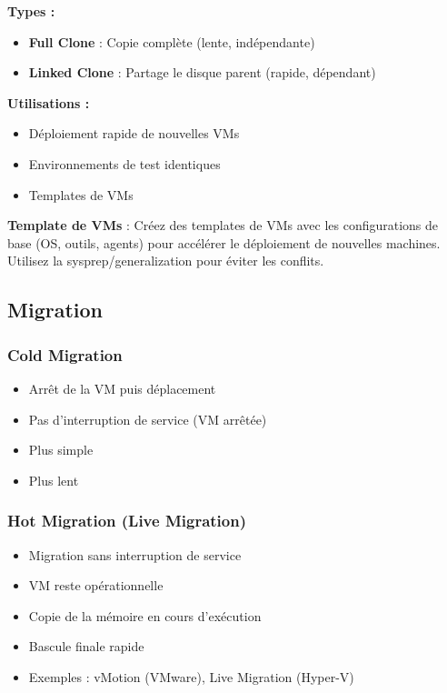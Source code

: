 \documentclass[11pt,a4paper]{article}
\begin{document}
\textbf{Types :}
\begin{itemize}
    \item \textbf{Full Clone} : Copie complète (lente, indépendante)
    \item \textbf{Linked Clone} : Partage le disque parent (rapide, dépendant)
\end{itemize}

\textbf{Utilisations :}
\begin{itemize}
    \item Déploiement rapide de nouvelles VMs
    \item Environnements de test identiques
    \item Templates de VMs
\end{itemize}

\begin{tipbox}
\textbf{Template de VMs} : Créez des templates de VMs avec les configurations de base (OS, outils, agents) pour accélérer le déploiement de nouvelles machines. Utilisez la sysprep/generalization pour éviter les conflits.
\end{tipbox}

\subsection{Migration}

\subsubsection{Cold Migration}

\begin{itemize}
    \item Arrêt de la VM puis déplacement
    \item Pas d'interruption de service (VM arrêtée)
    \item Plus simple
    \item Plus lent
\end{itemize}

\subsubsection{Hot Migration (Live Migration)}

\begin{itemize}
    \item Migration sans interruption de service
    \item VM reste opérationnelle
    \item Copie de la mémoire en cours d'exécution
    \item Bascule finale rapide
    \item Exemples : vMotion (VMware), Live Migration (Hyper-V)
\end{itemize}
\end{document}
